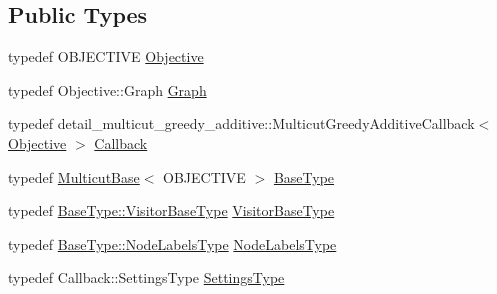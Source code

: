 \subsection*{Public Types}
\begin{DoxyCompactItemize}
\item 
typedef O\+B\+J\+E\+C\+T\+I\+V\+E \hyperlink{classnifty_1_1graph_1_1optimization_1_1multicut_1_1MulticutGreedyAdditive_a231d778a53049db1bd2ee0a379dc2a54}{Objective}
\item 
typedef Objective\+::\+Graph \hyperlink{classnifty_1_1graph_1_1optimization_1_1multicut_1_1MulticutGreedyAdditive_a8003da1b1e5fc1aa51572f7887da3524}{Graph}
\item 
typedef detail\+\_\+multicut\+\_\+greedy\+\_\+additive\+::\+Multicut\+Greedy\+Additive\+Callback$<$ \hyperlink{classnifty_1_1graph_1_1optimization_1_1multicut_1_1MulticutGreedyAdditive_a231d778a53049db1bd2ee0a379dc2a54}{Objective} $>$ \hyperlink{classnifty_1_1graph_1_1optimization_1_1multicut_1_1MulticutGreedyAdditive_a416a5984d400e28b4274a4126f5ac362}{Callback}
\item 
typedef \hyperlink{classnifty_1_1graph_1_1optimization_1_1multicut_1_1MulticutBase}{Multicut\+Base}$<$ O\+B\+J\+E\+C\+T\+I\+V\+E $>$ \hyperlink{classnifty_1_1graph_1_1optimization_1_1multicut_1_1MulticutGreedyAdditive_a4b7adaf94bc30fa94317f144b9defe18}{Base\+Type}
\item 
typedef \hyperlink{classnifty_1_1graph_1_1optimization_1_1common_1_1SolverBase_a5a14d64c70a9cc0eebc7d71d2b089f9b}{Base\+Type\+::\+Visitor\+Base\+Type} \hyperlink{classnifty_1_1graph_1_1optimization_1_1multicut_1_1MulticutGreedyAdditive_adc04def3b509e2b386fc0a6cb5f44a9a}{Visitor\+Base\+Type}
\item 
typedef \hyperlink{classnifty_1_1graph_1_1optimization_1_1common_1_1SolverBase_a6e4e465f3b6e039882669fcfb9714818}{Base\+Type\+::\+Node\+Labels\+Type} \hyperlink{classnifty_1_1graph_1_1optimization_1_1multicut_1_1MulticutGreedyAdditive_aae4ca5190ee50936fc0219aebbe95642}{Node\+Labels\+Type}
\item 
typedef Callback\+::\+Settings\+Type \hyperlink{classnifty_1_1graph_1_1optimization_1_1multicut_1_1MulticutGreedyAdditive_a5ab2bca40a57afb6cecb04e97204973b}{Settings\+Type}
\end{DoxyCompactItemize}
